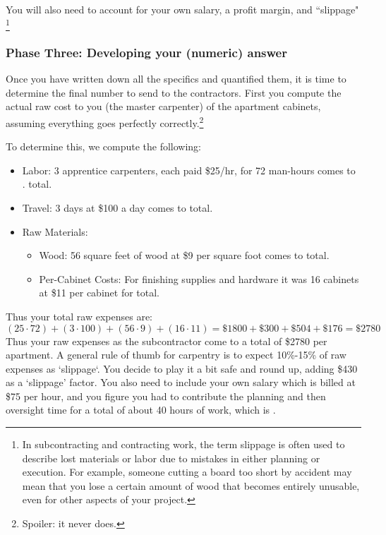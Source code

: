 \documentclass{ximera}
\begin{document}
    You will also need to account for your own salary, a profit margin, and ``slippage"
    \footnote{In subcontracting and contracting work, the term slippage is often used to describe lost materials or labor due to mistakes in either planning or execution. For example, someone cutting a board too short by accident may mean that you lose a certain amount of wood that becomes entirely unusable, even for other aspects of your project.}

\subsubsection*{Phase Three: Developing your (numeric) answer}
    Once you have written down all the specifics and quantified them, it is time to determine the final number to send to the contractors. First you compute the actual raw cost to you (the master carpenter) of the apartment cabinets, assuming everything goes perfectly correctly.\footnote{Spoiler: it never does.}
    
    To determine this, we compute the following:
    \begin{itemize}
        \item Labor: 3 apprentice carpenters, each paid \$25/hr, for 72 man-hours comes to . total.
        \item Travel: 3 days at \$100 a day comes to  total.
        \item Raw Materials:
        \begin{itemize}
            \item Wood: 56 square feet of wood at \$9 per square foot comes to  total.
            \item Per-Cabinet Costs: For finishing supplies and hardware it was 16 cabinets at \$11 per cabinet for  total.
        \end{itemize}
    \end{itemize}
    Thus your total raw expenses are:
    \[
        (25\cdot 72) + (3\cdot 100) + (56\cdot 9) + (16\cdot 11) = \$1800 + \$300 + \$504 + \$176 = \$2780
    \]
    Thus your raw expenses as the subcontractor come to a total of \$2780 per apartment. A general rule of thumb for carpentry is to expect 10\%-15\% of raw expenses as `slippage`. You decide to play it a bit safe and round up, adding \$430 as a `slippage' factor. You also need to include your own salary which is billed at \$75 per hour, and you figure you had to contribute the planning and then oversight time for a total of about 40 hours of work, which is .
    
\end{document}
